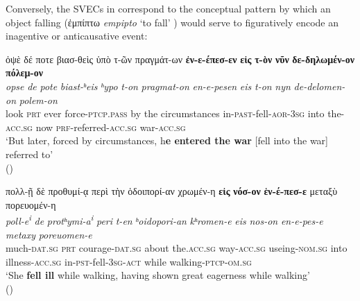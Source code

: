 \documentclass[output=paper,colorlinks,citecolor=brown]{langscibook}
\begin{document}
\z

\z

Conversely, the SVECs in  correspond to the conceptual pattern by which an object
falling (ἐμπίπτω \emph{empipto} `to fall'%
)
would serve to figuratively encode an inagentive or anticausative event:


\ea\label{ex:vc:8}

\ea

\glll ὀψὲ δέ ποτε βιασ-θεὶς ὑπὸ τ-ῶν πραγμάτ-ων \textbf{ἐν-ε-έπεσ-εν} \textbf{εἰς} \textbf{τ-ὸν} \textbf{νῦν} \textbf{δε-δηλωμέν-ον} \textbf{πόλεμ-ον}\\
 \textit{opse} \textit{de} \textit{pote} \textit{biast-ʰeis} \textit{ʰypo}
\textit{t-on} \textit{pragmat-on} \textit{en-e-pesen} \textit{eis} \textit{t-on} \textit{nyn} \textit{de-delomen-on} \textit{polem-on}\\
look \textsc{prt} ever force-\textsc{ptcp.pass} by the circumstances in-\textsc{past-}fell\textsc{-aor-3sg} into the-\textsc{acc.sg} now
\textsc{prf-}referred-\textsc{acc.sg} war-\textsc{acc.sg}\\
\glt `But later, forced by circumstances, h\textbf{e entered the war} {[}fell into the war{]} referred to' \\
\hspace*{\fill}()

\ex

\glll πολλ-ῇ δὲ προθυμί-ᾳ περὶ τὴν ὁδοιπορί-αν χρωμέν-η \textbf{εἰς} \textbf{νόσ-ον} \textbf{ἑν-έ-πεσ-ε} μεταξὺ πορευομέν-η\\
\textit{poll-e\textsuperscript{i}} \textit{de} \textit{protʰymi-a\textsuperscript{i}} \textit{peri} \textit{t-en}
\textit{ʰoidopori-an} \textit{kʰromen-e} \textit{eis} \textit{nos-on} \textit{en-e-pes-e} \textit{metaxy}
\textit{poreuomen-e}\\
much-\textsc{dat.sg} \textsc{prt} courage-\textsc{dat.sg} about the.\textsc{acc.sg}
way-\textsc{acc.sg} useing\textsc{-nom.sg} into illness-\textsc{acc.sg}
in-\textsc{pst-}fell-\textsc{3sg-act} while walking\textsc{-ptcp-om.sg}\\
\glt `She \textbf{fell ill} while walking, having shown great eagerness while walking' \\
\hspace*{\fill}()

\z
\end{document}

